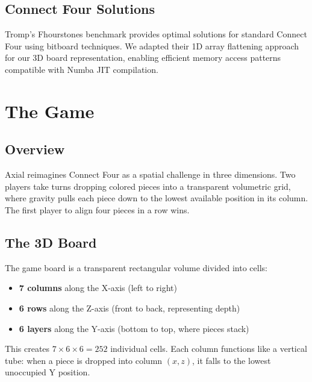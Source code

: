 \documentclass[11pt]{article}
\begin{document}
\subsection{Connect Four Solutions}

Tromp's Fhourstones benchmark \cite{tromp1988} provides optimal solutions for standard Connect Four using bitboard techniques. We adapted their 1D array flattening approach for our 3D board representation, enabling efficient memory access patterns compatible with Numba JIT compilation.

\section{The Game}

\subsection{Overview}

Axial reimagines Connect Four as a spatial challenge in three dimensions. Two players take turns dropping colored pieces into a transparent volumetric grid, where gravity pulls each piece down to the lowest available position in its column. The first player to align four pieces in a row wins.


\subsection{The 3D Board}

The game board is a transparent rectangular volume divided into cells:

\begin{itemize}
    \item \textbf{7 columns} along the X-axis (left to right)
    \item \textbf{6 rows} along the Z-axis (front to back, representing depth)
    \item \textbf{6 layers} along the Y-axis (bottom to top, where pieces stack)
\end{itemize}

This creates $7 \times 6 \times 6 = 252$ individual cells. Each column functions like a vertical tube: when a piece is dropped into column $(x, z)$, it falls to the lowest unoccupied Y position.
\end{document}
